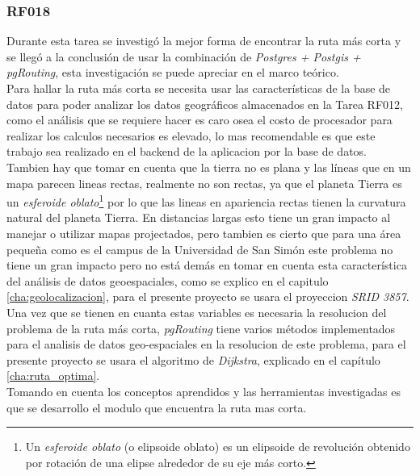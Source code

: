 \subsubsection{RF018}
\label{subs:RF018}

Durante esta tarea se investigó la mejor forma de encontrar la ruta más corta y se llegó a la conclusión de usar la combinación de \emph{Postgres + Postgis + pgRouting}, esta investigación se puede apreciar en el marco teórico.\\

Para hallar la ruta más corta se necesita usar las características de la base de datos para poder analizar los datos geográficos almacenados en la Tarea RF012, como el análisis que se requiere hacer es caro osea el costo de procesador para realizar los calculos necesarios es elevado, lo mas recomendable es que este trabajo sea realizado en el backend de la aplicacion por la base de datos.\\

Tambien hay que tomar en cuenta que la tierra no es plana y las líneas que en un mapa parecen lineas rectas, realmente no son rectas, ya que el planeta Tierra es un \emph{esferoide oblato}\footnote{Un \emph{esferoide oblato} (o elipsoide oblato) es un elipsoide de revolución obtenido por rotación de una elipse alrededor de su eje más corto.} por lo que las lineas en apariencia rectas tienen la curvatura natural del planeta Tierra. En distancias largas esto tiene un gran impacto al manejar o utilizar mapas projectados, pero tambien es cierto que para una área pequeña como es el campus de la Universidad de San Simón este problema no tiene un gran impacto pero no está demás en tomar en cuenta esta característica del análisis de datos geoespaciales, como se explico en el capitulo \ref{cha:geolocalizacion}, para el presente proyecto se usara el proyeccion \emph{SRID 3857}.\\

Una vez que se tienen en cuanta estas variables es necesaria la resolucion del problema de la ruta más corta, \emph{pgRouting} tiene varios métodos implementados para el analisis de datos geo-espaciales en la resolucion de este problema, para el presente proyecto se usara el algoritmo de \emph{Dijkstra}, explicado en el capítulo \ref{cha:ruta_optima}.\\

Tomando en cuenta los conceptos aprendidos y las herramientas investigadas es que se desarrollo el modulo que encuentra la ruta mas corta.

